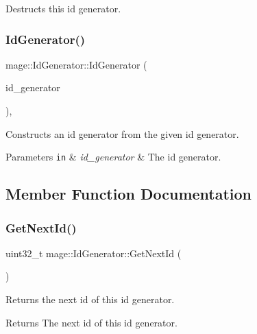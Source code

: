 Destructs this id generator. \hypertarget{structmage_1_1_id_generator_a6f502d2cd8b63e7c76f31834b028a11d}{}\label{structmage_1_1_id_generator_a6f502d2cd8b63e7c76f31834b028a11d} 
\subsubsection{\texorpdfstring{Id\+Generator()}{IdGenerator()}\hspace{0.1cm}{\footnotesize\ttfamily [2/2]}}
{\footnotesize\ttfamily mage\+::\+Id\+Generator\+::\+Id\+Generator (\begin{DoxyParamCaption}\item[{const \hyperlink{structmage_1_1_id_generator}{Id\+Generator} \&}]{id\+\_\+generator }\end{DoxyParamCaption})\hspace{0.3cm}{\ttfamily [private]}, {\ttfamily [delete]}}

Constructs an id generator from the given id generator.


\begin{DoxyParams}[1]{Parameters}
\mbox{\tt in}  & {\em id\+\_\+generator} & The id generator. \\
\hline
\end{DoxyParams}


\subsection{Member Function Documentation}
\hypertarget{structmage_1_1_id_generator_a4c6252edb5d33c68603893f2a03ad25d}{}\label{structmage_1_1_id_generator_a4c6252edb5d33c68603893f2a03ad25d} 
\subsubsection{\texorpdfstring{Get\+Next\+Id()}{GetNextId()}}
{\footnotesize\ttfamily uint32\+\_\+t mage\+::\+Id\+Generator\+::\+Get\+Next\+Id (\begin{DoxyParamCaption}{ }\end{DoxyParamCaption})}

Returns the next id of this id generator.

\begin{DoxyReturn}{Returns}
The next id of this id generator. 
\end{DoxyReturn}
\hypertarget{structmage_1_1_id_generator_a370c8289f38a534006e8b9ca7ec78026}{}\label{structmage_1_1_id_generator_a370c8289f38a534006e8b9ca7ec78026} 
